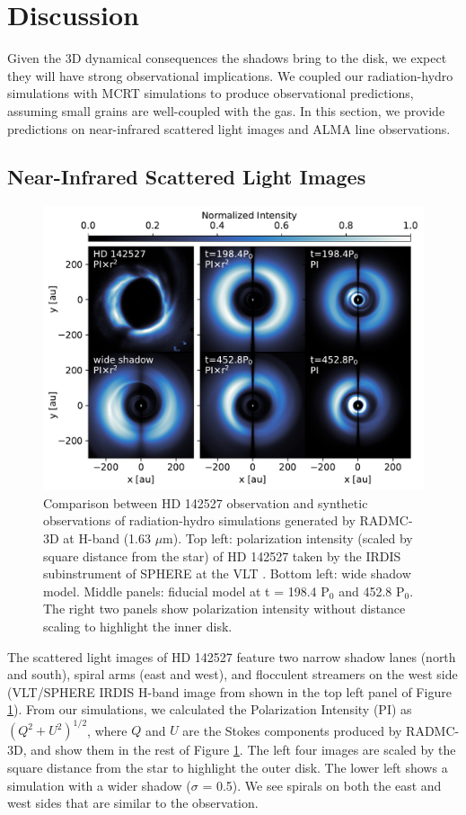 \documentclass[twocolumn,tighten]{aastex631}
\begin{document}
\section{Discussion} \label{sec:discussion}
Given the 3D dynamical consequences the shadows bring to the disk, we expect they will have strong observational implications. We coupled our radiation-hydro simulations with MCRT simulations to produce observational predictions, assuming small grains are well-coupled with the gas. In this section, we provide predictions on near-infrared scattered light images and ALMA line observations.

\subsection{Near-Infrared Scattered Light Images} \label{sec:scattered}
\begin{figure}
\includegraphics[width=\linewidth]{Figure4.pdf}
\caption{Comparison between HD 142527 observation and synthetic observations of radiation-hydro simulations generated by RADMC-3D at H-band (1.63 $\mu$m). Top left: polarization intensity (scaled by square distance from the star) of HD 142527 taken by the IRDIS subinstrument of SPHERE at the VLT \citep{hunziker21}. Bottom left: wide shadow model. Middle panels: fiducial model at t = 198.4 P$_0$ and 452.8 P$_0$. The right two panels show polarization intensity without distance scaling to highlight the inner disk.}
\label{fig:4}
\end{figure}
The scattered light images of HD 142527 feature two narrow shadow lanes (north and south), spiral arms (east and west), and flocculent streamers on the west side (VLT/SPHERE IRDIS H-band image from \citealt{hunziker21} shown in the top left panel of Figure \ref{fig:4}). From our simulations, we calculated the Polarization Intensity (PI) as $(Q^2 + U^2)^{1/2}$, where $Q$ and $U$ are the Stokes components produced by RADMC-3D, and show them in the rest of Figure \ref{fig:4}. The left four images are scaled by the square distance from the star to highlight the outer disk. The lower left shows a simulation with a wider shadow ($\sigma$ = 0.5). We see spirals on both the east and west sides that are similar to the observation.
\end{document}
